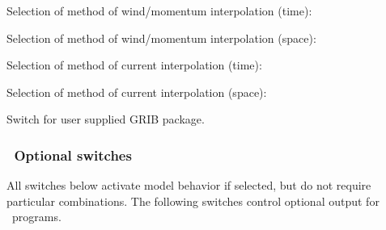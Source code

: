 \noindent
Selection of method of wind/momentum interpolation (time):
\begin{slist}
\end{slist}

\noindent
Selection of method of wind/momentum interpolation (space):
\begin{slist}
\end{slist}

\noindent
Selection of method of current interpolation (time):
\begin{slist}
\end{slist}

\noindent
Selection of method of current interpolation (space):
\begin{slist}
\end{slist}

\noindent
Switch for user supplied GRIB package.
\begin{slist}
\end{slist}

\vsssub
\subsubsection{~Optional switches} \label{sub:opt_switch}
\vsssub

All switches below activate model behavior if selected, but do not require
particular combinations. The following switches control optional output for
\ws\ programs.

